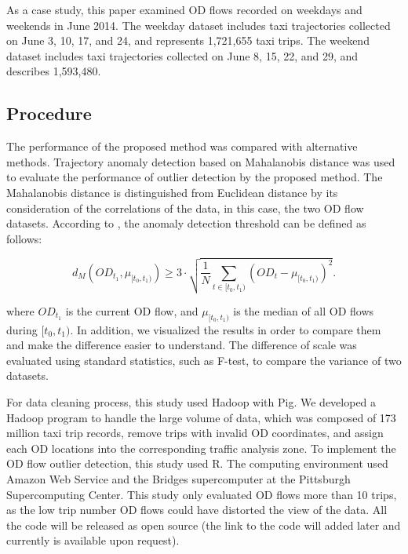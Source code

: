 \documentclass[a4paper,UKenglish]{lipics-v2018}
\begin{document}
As a case study, this paper examined OD flows recorded on weekdays and weekends in June 2014. The weekday dataset includes taxi trajectories collected on June 3, 10, 17, and 24, and represents 1,721,655 taxi trips. The weekend dataset includes taxi trajectories collected on June 8, 15, 22, and 29, and describes 1,593,480. 

\subsection{Procedure}

The performance of the proposed method was compared with alternative methods. Trajectory anomaly detection based on Mahalanobis distance \cite{pan13ACMGIS}  was used to evaluate the performance of outlier detection by the proposed method. The Mahalanobis distance is distinguished from Euclidean distance by its consideration of the correlations of the data, in this case, the two OD flow datasets. According to \cite{pan13ACMGIS}, the anomaly detection threshold can be defined as follows:

\begin{equation*}
d_M(OD_{t_1}, \mu_{[t_0,t_1)}) \geq 3\cdot \sqrt{\frac{1}{N}\sum_{t \in [t_0,t_1)} (OD_{t} - \mu_{[t_0,t_1)})^2} .
\end{equation*}

where $OD_{t_1}$ is the current OD flow, and $\mu_{[t_0,t_1)}$ is the median of all OD flows during $[t_0,t_1)$. In addition, we visualized the results in order to compare them and make the difference easier to understand. The difference of scale was evaluated using  standard statistics, such as F-test, to compare the variance of two datasets.   

For data cleaning process, this study used Hadoop with Pig. We developed a Hadoop program to handle the large volume of data, which was composed of 173 million taxi trip records, remove trips with invalid OD coordinates, and assign each OD locations into the corresponding traffic analysis zone.  
To implement the OD flow outlier detection, this study used R. The computing environment used Amazon Web Service and the Bridges supercomputer at the Pittsburgh Supercomputing Center. This study only evaluated OD flows more than 10 trips, as the low trip number OD flows could have distorted the view of the data. All the code will be released as open source (the link to the code will added later and currently is available upon request).

\end{document}
